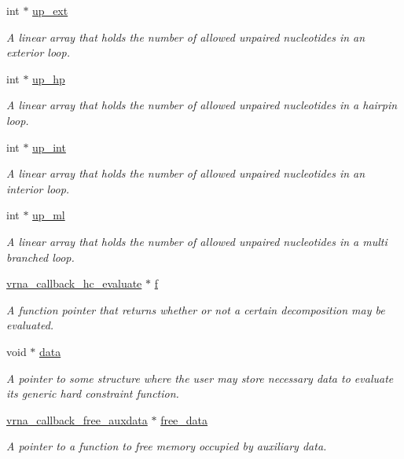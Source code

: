\begin{DoxyCompactItemize}
\begin{tabbing}
\end{tabbing}\item 
int $\ast$ \mbox{\hyperlink{group__hard__constraints_a60094038af04093b2fee9b883266ff75}{up\+\_\+ext}}
\begin{DoxyCompactList}\small\item\em A linear array that holds the number of allowed unpaired nucleotides in an exterior loop. \end{DoxyCompactList}\item 
int $\ast$ \mbox{\hyperlink{group__hard__constraints_a853255558e7e7d9eb382ac142ac8de3d}{up\+\_\+hp}}
\begin{DoxyCompactList}\small\item\em A linear array that holds the number of allowed unpaired nucleotides in a hairpin loop. \end{DoxyCompactList}\item 
int $\ast$ \mbox{\hyperlink{group__hard__constraints_a455f994af0ec892d84fee1bf60d14a81}{up\+\_\+int}}
\begin{DoxyCompactList}\small\item\em A linear array that holds the number of allowed unpaired nucleotides in an interior loop. \end{DoxyCompactList}\item 
int $\ast$ \mbox{\hyperlink{group__hard__constraints_aa318079c2e3cfaca8dc589cc478d3b29}{up\+\_\+ml}}
\begin{DoxyCompactList}\small\item\em A linear array that holds the number of allowed unpaired nucleotides in a multi branched loop. \end{DoxyCompactList}\item 
\mbox{\hyperlink{group__hard__constraints_gae465f1d4a3d8b6592b38ecbb0d9f613d}{vrna\+\_\+callback\+\_\+hc\+\_\+evaluate}} $\ast$ \mbox{\hyperlink{group__hard__constraints_a85714afbf27012165ec80c564bd62931}{f}}
\begin{DoxyCompactList}\small\item\em A function pointer that returns whether or not a certain decomposition may be evaluated. \end{DoxyCompactList}\item 
void $\ast$ \mbox{\hyperlink{group__hard__constraints_acef3d722142cb5f4a8e114e5fbce3b1a}{data}}
\begin{DoxyCompactList}\small\item\em A pointer to some structure where the user may store necessary data to evaluate its generic hard constraint function. \end{DoxyCompactList}\item 
\mbox{\hyperlink{group__fold__compound_ga7806651f51b195013839a218b3bbd5a3}{vrna\+\_\+callback\+\_\+free\+\_\+auxdata}} $\ast$ \mbox{\hyperlink{group__hard__constraints_a970e0e202c9e46ebc7640ddc43357ba6}{free\+\_\+data}}
\begin{DoxyCompactList}\small\item\em A pointer to a function to free memory occupied by auxiliary data. \end{DoxyCompactList}\end{DoxyCompactItemize}


